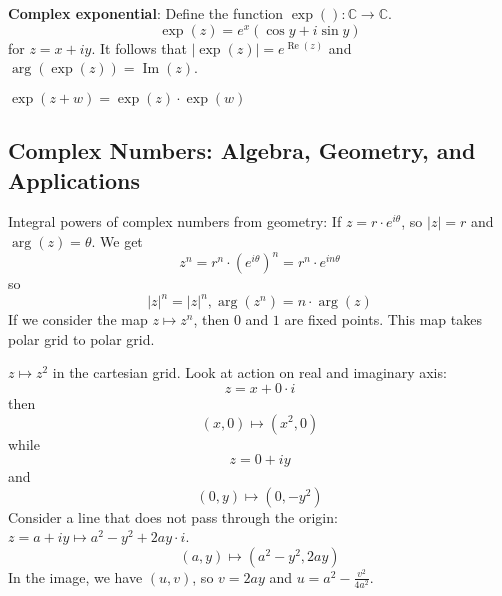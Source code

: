 \documentclass{report}
\begin{document}
\textbf{Complex exponential}: Define the function $\exp() : \mathbb{C} \rightarrow \mathbb{C}$. 
    \begin{equation*}
        \exp(z) = e^{x}(\cos{y} + i\sin{y})
    \end{equation*}
for $z = x + iy$. It follows that $\lvert \exp(z) \rvert = e^{\mathop{Re}(z)}$ and $\mathop{arg}(\exp(z)) = \mathop{Im}(z)$.

\begin{theorem}{}
    $\exp(z + w) = \exp(z) \cdot \exp(w)$
\end{theorem}

\begin{topic}
    \section{Complex Numbers: Algebra, Geometry, and Applications}
\end{topic}

Integral powers of complex numbers from geometry: If $z = r \cdot e^{i\theta}$, so $\lvert z \rvert = r$ and $\mathop{arg}(z) = \theta$. We get 
    \begin{equation*}
        z^{n} = r^{n} \cdot(e^{i\theta})^{n} = r^{n} \cdot e^{in\theta}
    \end{equation*}
so
    \begin{equation*}
        \lvert z \rvert^{n} = \lvert z \rvert^{n}, \mathop{arg}(z^{n}) = n \cdot \mathop{arg}(z)
    \end{equation*}
If we consider the map $z \mapsto z^{n}$, then $0$ and $1$ are fixed points. This map takes polar grid to polar grid.

\begin{examples}
    \begin{example}
        $z \mapsto z^{2}$ in the cartesian grid. Look at action on real and imaginary axis:
            \begin{equation*}
                z = x + 0 \cdot i
            \end{equation*}
        then
            \begin{equation*}
                (x, 0) \mapsto (x^{2}, 0)
            \end{equation*}
        while
            \begin{equation*}
                z = 0 + iy
            \end{equation*}
        and
            \begin{equation*}
                (0, y) \mapsto (0, -y^{2})
            \end{equation*}
        Consider a line that does not pass through the origin: $z = a + iy \mapsto a^{2} - y^{2} + 2ay \cdot i$.
            \begin{equation*}
                (a, y) \mapsto (a^{2} - y^{2}, 2ay)
            \end{equation*} 
        In the image, we have $(u, v)$, so $v = 2ay$ and $u = a^{2} - \frac{v^{2}}{4a^{2}}$.
    \end{example}
\end{examples}
\end{document}
